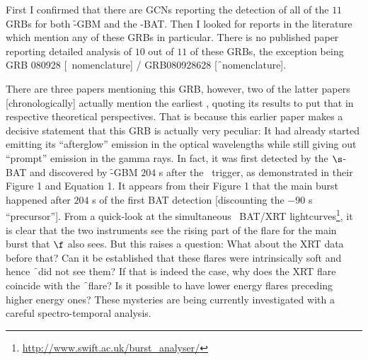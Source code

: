 First I confirmed that there are GCNs reporting the detection of all of the $11$ GRBs for both \f -GBM and the \s -BAT. Then I looked for reports in the literature which mention any of these GRBs in particular. There is no published paper reporting detailed analysis of $10$ out of $11$ of these GRBs, the exception being GRB 080928 [\s\ nomenclature] / GRB080928628 [\f\ nomenclature].

There are three papers mentioning this GRB, however, two of the latter papers [chronologically] actually mention the earliest \citep{Rossi_et_al.-2011-A&A}, quoting its results to put that in respective theoretical perspectives. That is because this earlier paper makes a decisive statement that this GRB is actually very peculiar: It had already started emitting its ``afterglow'' emission in the optical wavelengths while still giving out ``prompt'' emission in the gamma rays. In fact, it was first detected by the $\s$-BAT and discovered by \f -GBM $204$ s after the \s\ trigger, as demonstrated in their Figure 1 and Equation 1. It appears from their Figure 1 that the main burst happened after $204$ s of the first BAT detection [discounting the $-90$ s ``precursor'']. From a quick-look at the simultaneous \s\ BAT/XRT lightcurves\footnote{\url{http://www.swift.ac.uk/burst_analyser/}}, it is clear that the two instruments see the rising part of the flare for the main burst that $\f$ also sees. But this raises a question: What about the XRT data before that? Can it be established that these flares were intrinsically soft and hence \f\ did not see them? If that is indeed the case, why does the XRT flare coincide with the \f\ flare? Is it possible to have lower energy flares preceding higher energy ones? These mysteries are being currently investigated with a careful spectro-temporal analysis.


